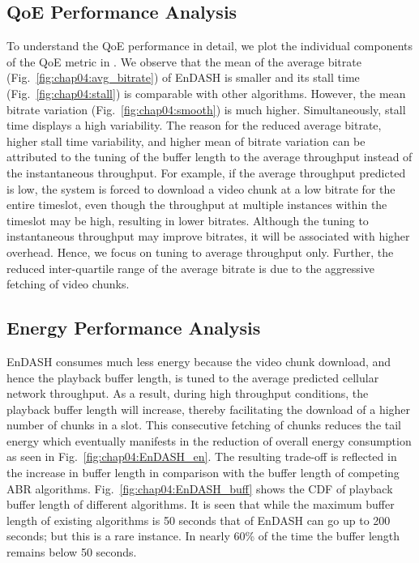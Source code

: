  \subsection{QoE Performance Analysis}
To understand the \ac{QoE} performance in detail, we plot the individual components of the \ac{QoE} metric in \fig{\ref{fig:chap04:indi_QoE}}. We observe that the mean of the average bitrate (Fig.~\ref{fig:chap04:avg_bitrate}) of EnDASH is smaller and its stall time (Fig.~\ref{fig:chap04:stall}) is comparable with other algorithms. However, the mean bitrate variation (Fig.~\ref{fig:chap04:smooth}) is much higher. Simultaneously, stall time displays a high variability. The reason for the reduced average bitrate, higher stall time variability, and higher mean of bitrate variation can be attributed to the tuning of the buffer length to the average throughput instead of the instantaneous throughput. For example, if the average throughput predicted is low, the system is forced to download a video chunk at a low bitrate for the entire timeslot, even though the throughput at multiple instances within the timeslot may be high, resulting in lower bitrates. Although the tuning to instantaneous throughput may improve bitrates, it will be associated with higher overhead. Hence, we focus on tuning to average throughput only. Further, the reduced inter-quartile range of the average bitrate is due to the aggressive fetching of video chunks. 
\subsection{Energy Performance Analysis}
EnDASH consumes much less energy because the video chunk download, and hence the playback buffer length, is tuned to the average predicted cellular network throughput. As a result, during high throughput conditions, the playback buffer length will increase, thereby facilitating the download of a higher number of chunks in a slot. This consecutive fetching of chunks reduces the tail energy which eventually manifests in the reduction of overall energy consumption as seen in Fig.~\ref{fig:chap04:EnDASH_en}. The resulting trade-off is reflected in the increase in buffer length in comparison with the buffer length of competing ABR algorithms.  Fig.~\ref{fig:chap04:EnDASH_buff} shows the CDF of playback buffer length of different algorithms. It is seen that while the maximum buffer length of existing algorithms is 50 seconds that of EnDASH can go up to 200 seconds; but this is a rare instance. In nearly 60\% of the time the buffer length remains below 50 seconds.

